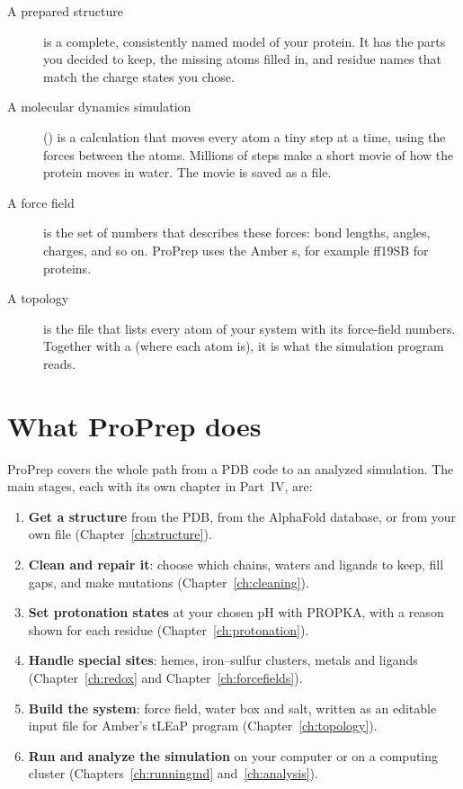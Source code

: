 \begin{description}
  \item[A prepared structure] is a complete, consistently named model of your
        protein. It has the parts you decided to keep, the missing atoms filled
        in, and residue names that match the charge states you chose.
  \item[A molecular dynamics simulation] () is a calculation that
        moves every atom a tiny step at a time, using the forces between the
        atoms. Millions of steps make a short movie of how the protein moves in
        water. The movie is saved as a  file.
  \item[A force field] is the set of numbers that describes these forces:
        bond lengths, angles, charges, and so on. ProPrep uses the Amber
        s, for example ff19SB for proteins.
  \item[A topology] is the file that lists every atom of your system with its
        force-field numbers. Together with a  (where each
        atom is), it is what the simulation program reads.
\end{description}

\section{What ProPrep does}
\label{sec:whatis-does}

ProPrep covers the whole path from a PDB code to an analyzed simulation. The
main stages, each with its own chapter in Part~IV, are:

\begin{enumerate}
  \item \textbf{Get a structure} from the PDB, from the AlphaFold database, or
        from your own file (Chapter~\ref{ch:structure}).
  \item \textbf{Clean and repair it}: choose which chains, waters and ligands
        to keep, fill gaps, and make mutations (Chapter~\ref{ch:cleaning}).
  \item \textbf{Set protonation states} at your chosen pH with PROPKA, with a
        reason shown for each residue (Chapter~\ref{ch:protonation}).
  \item \textbf{Handle special sites}: hemes, iron--sulfur clusters, metals
        and ligands (Chapter~\ref{ch:redox} and Chapter~\ref{ch:forcefields}).
  \item \textbf{Build the system}: force field, water box and salt, written as
        an editable input file for Amber's tLEaP program
        (Chapter~\ref{ch:topology}).
  \item \textbf{Run and analyze the simulation} on your computer or on a
        computing cluster (Chapters~\ref{ch:runningmd} and~\ref{ch:analysis}).
\end{enumerate}

